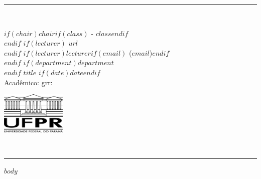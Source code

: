 \documentclass[a4paper]{article}
\newcommand{\HRule}{\noindent\rule{\linewidth}{0.2mm}}
\begin{document}
\pagestyle{empty}

\HRule\\
\noindent
\begin{minipage}[t]{0.75\textwidth}
  \baselineskip 12pt
  $if(chair)$$chair$$if(class)$ - $class$$endif$\\ $endif$
  $if(lecturer)$ \hfill $url$\\ $endif$
  $if(lecturer)$$lecturer$$if(email)$ ($email$)$endif$\\ $endif$
  $if(department)$$department$\\ $endif$
  $title$ $if(date)$\hfill $date$$endif$\\
  Acadêmico: \hfill grr: \hspace{2cm}
\end{minipage}
\hfill
\begin{minipage}[t]{0.25\textwidth}
  \begin{flushright}
    \vspace*{-0.35cm}
    \includegraphics[height=2cm]{ufpr_logo.png}
  \end{flushright}
\end{minipage}\\
\HRule

\hspace{0.5cm}

$body$
\end{document}
